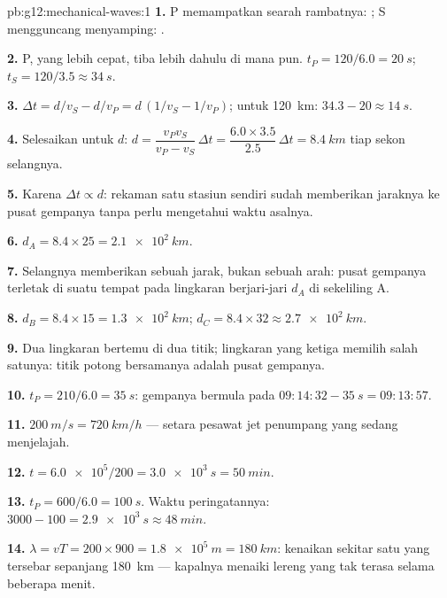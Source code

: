 \begin{solution}{pb:g12:mechanical-waves:1}
\textbf{1.}  P memampatkan searah rambatnya: ;
 S mengguncang menyamping: .

\textbf{2.}  P, yang lebih cepat, tiba lebih dahulu di mana
pun. $t_P = 120/6.0 = \qty{20}{s}$; $t_S = 120/3.5 \approx \qty{34}{s}$.

\textbf{3.} $\Delta t = d/v_S - d/v_P = d\,(1/v_S - 1/v_P)$; untuk
\qty{120}{km}: $34.3 - 20 \approx \qty{14}{s}$.

\textbf{4.} Selesaikan untuk $d$:
$d = \dfrac{v_P v_S}{v_P - v_S}\,\Delta t
= \dfrac{6.0 \times 3.5}{2.5}\,\Delta t = \qty{8.4}{km}$ tiap sekon
selangnya.

\textbf{5.} Karena $\Delta t \propto d$: rekaman satu stasiun sendiri
sudah memberikan jaraknya ke pusat gempanya tanpa perlu mengetahui waktu
asalnya.

\textbf{6.} $d_A = 8.4 \times 25 = \qty{2.1e2}{km}$.

\textbf{7.} Selangnya memberikan sebuah jarak, bukan sebuah arah: pusat
gempanya terletak di suatu tempat pada lingkaran berjari-jari $d_A$ di
sekeliling A.

\textbf{8.} $d_B = 8.4 \times 15 = \qty{1.3e2}{km}$;
$d_C = 8.4 \times 32 \approx \qty{2.7e2}{km}$.

\textbf{9.} Dua lingkaran bertemu di dua titik; lingkaran yang ketiga
memilih salah satunya: titik potong bersamanya adalah pusat gempanya.

\textbf{10.} $t_P = 210/6.0 = \qty{35}{s}$: gempanya bermula pada
$09{:}14{:}32 - \qty{35}{s} = 09{:}13{:}57$.

\textbf{11.} $\qty{200}{m/s} = \qty{720}{km/h}$ --- setara pesawat jet
penumpang yang sedang menjelajah.

\textbf{12.} $t = \num{6.0e5}/200 = \qty{3.0e3}{s} = \qty{50}{min}$.

\textbf{13.} $t_P = 600/6.0 = \qty{100}{s}$. Waktu peringatannya:
$3000 - 100 = \qty{2.9e3}{s} \approx \qty{48}{min}$.

\textbf{14.} $\lambda = vT = 200 \times 900 = \qty{1.8e5}{m} =
\qty{180}{km}$: kenaikan sekitar satu  yang tersebar sepanjang
\qty{180}{km} --- kapalnya menaiki lereng yang tak terasa selama
beberapa menit.


\end{solution}
